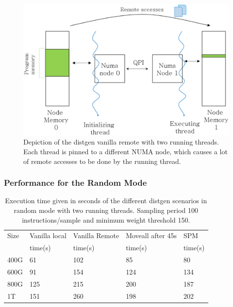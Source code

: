 \begin{figure}
	\centering
		\includegraphics[width=.7\textwidth]{figures/distgentt-remote.eps}
		\caption[Depiction of the working of the distgen vanilla remote scenario with two threads]{Depiction of the distgen vanilla remote with two running threads. Each thread is pinned to a different NUMA node, which causes a lot of remote accesses to be done by the running thread.}
		\label{fig:dgentt-remote}
\end{figure}
\FloatBarrier
\subsubsection{Performance for the Random Mode}\label{subsection:res-dgrandom-2t-scens}

\begin{table}
	\centering
		\begin{tabularx}{.9\textwidth}{|l|l|l|l|X|}
		\hline
			Size & Vanilla local & Vanilla Remote & Moveall after 45s & SPM \\
			 & time(s) & time(s) & time(s) & time(s)  \\
			\hline
			400G & 61 & 102 & 85 & 80\\
			\hline
			600G & 91 & 154 & 124 & 134\\
			\hline
			800G & 125 & 215 & 200 & 187\\
			\hline
			1T & 151 & 260 & 198 & 202\\
			\hline
		\end{tabularx}
		\caption{Execution time given in seconds of the different distgen scenarios in random mode with two running threads. Sampling period 100 instructions/sample and minimum weight threshold 150.}
		\label{table:res-dgentimrdm2t}
\end{table}

